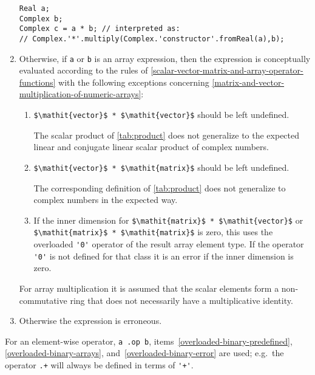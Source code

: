 \begin{enumerate}
\begin{nonnormative}
\begin{lstlisting}[language=modelica]
Real a;
Complex b;
Complex c = a * b; // interpreted as:
// Complex.'*'.multiply(Complex.'constructor'.fromReal(a),b);
\end{lstlisting}
\end{nonnormative}
\item\label{overloaded-binary-arrays}
  Otherwise, if \lstinline!a! or \lstinline!b! is an array expression, then the expression is
  conceptually evaluated according to the rules of \cref{scalar-vector-matrix-and-array-operator-functions} with the
  following exceptions concerning \cref{matrix-and-vector-multiplication-of-numeric-arrays}:
  \begin{enumerate}
  \def\labelenumii{(\alph{enumii})}
  \item
    \lstinline!$\mathit{vector}$ * $\mathit{vector}$! should be left undefined.
    \begin{nonnormative}
    The scalar product of \cref{tab:product} does not generalize to the expected linear and conjugate linear scalar product of complex numbers.
    \end{nonnormative}
  \item
    \lstinline!$\mathit{vector}$ * $\mathit{matrix}$! should be left undefined.
    \begin{nonnormative}
    The corresponding definition of \cref{tab:product} does not generalize to complex numbers in the expected way.
    \end{nonnormative}
  \item
    If the inner dimension for \lstinline!$\mathit{matrix}$ * $\mathit{vector}$! or \lstinline!$\mathit{matrix}$ * $\mathit{matrix}$! is zero, this uses the overloaded \lstinline!'0'! operator of the result array element type.  If the operator \lstinline!'0'! is not defined for that class it is an error if the inner dimension is zero.
  \end{enumerate}

\begin{nonnormative}
For array multiplication it is assumed that the scalar elements
form a non-commutative ring that does not necessarily have a
multiplicative identity.
\end{nonnormative}

\item\label{overloaded-binary-error}
  Otherwise the expression is erroneous.
\end{enumerate}

For an element-wise operator, \lstinline!a .op b!, items~\ref{overloaded-binary-predefined}, \ref{overloaded-binary-arrays}, and~\ref{overloaded-binary-error} are used; e.g.\ the operator \lstinline!.+! will always be defined in terms of \lstinline!'+'!.

